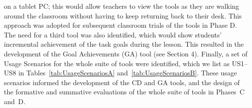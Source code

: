 on a tablet PC; this would allow teachers to view the tools as they 
are walking around the classroom without having to keep returning back
to their desk. This approach was adopted 
for subsequent classroom trials of the tools in Phase D. 
% 
%
The need for a third tool was also identified, 
which would show students' incremental achievement of the task goals during the lesson. 
This resulted in the development of the Goal Achievements (GA) tool (see Section 4).  
Finally, a set of Usage Scenarios for the whole suite of tools were identified, 
which we list as US1--US8 in Tables~\ref{tab:UsageScenariosA}
and~\ref{tab:UsageScenariosB}. 
These usage scenarios informed the development of the CD and GA tools,
and the design of the formative and summative evaluations of the 
whole suite of tools in Phases~C and~D. 

